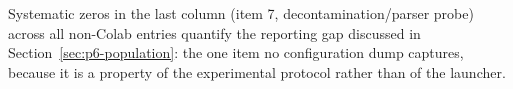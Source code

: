Systematic zeros in the last column (item 7, decontamination/parser probe)
across all non-Colab entries quantify the reporting gap discussed in
Section~\ref{sec:p6-population}: the one item no configuration dump captures,
because it is a property of the experimental protocol rather than of the
launcher.
